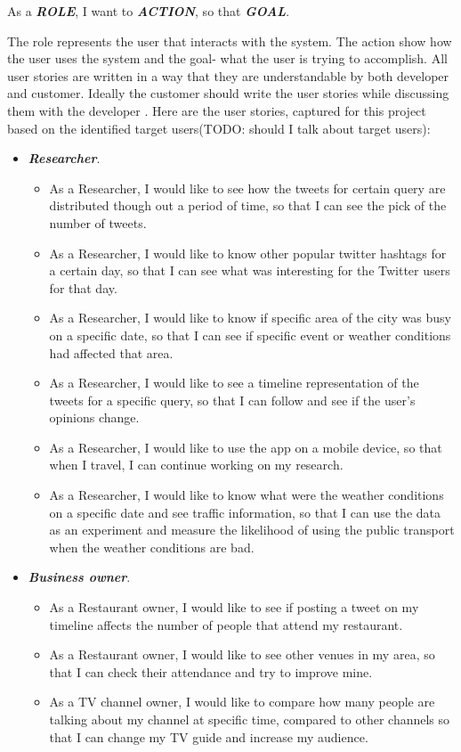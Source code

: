 \documentclass{l4proj}
\begin{document}
	\begin{center}
		As a \textbf{\textit{ROLE}}, I want to \textbf{\textit{ACTION}}, so that \textbf{\textit{GOAL}}. \cite{sets}
	\end{center}

The role represents the user that interacts with the system. The action show how the user uses the system and the goal- what the user is trying to accomplish. All user stories are written in a way that they are understandable by both developer and customer. Ideally the customer should write the user stories while discussing them with the developer \cite{sets}. Here are the user stories, captured for this project based on the identified target users(TODO: should I talk about target users):    

\begin{itemize}%
	\item \textbf{\textit{Researcher}}.
	\begin{itemize}
		\item As a Researcher, I would like to see how the tweets for certain query are distributed though out a period of time, so that I can see the pick of the number of tweets.
		\item As a Researcher, I would like to know other popular twitter hashtags for a certain day, so that I can see what was interesting for the Twitter users for that day.
		\item As a Researcher, I would like to know if specific area of the city was busy on a specific date, so that I can see if specific event or weather conditions had affected that area.
		\item As a Researcher, I would like to see a timeline representation of the tweets for a specific query, so that I can follow and see if the user’s opinions change.
		\item As a Researcher, I would like to use the app on a mobile device, so that when I travel, I can continue working on my research.
		\item As a Researcher, I would like to know what were the weather conditions on a specific date and see traffic information, so that I can use the data as an experiment and measure the likelihood of using the public transport when the weather conditions are bad. 
	\end{itemize}
	
	\item \textbf{\textit{Business owner}}.
	\begin{itemize}
		\item As a Restaurant owner, I would like to see if posting a tweet on my timeline affects the number of people that attend my restaurant.
		\item As a Restaurant owner, I would like to see other venues in my area, so that I can check their attendance and try to improve mine.
		\item As a TV channel owner, I would like to compare how many people are talking about my channel at specific time, compared to other channels so that I can change my TV guide and increase my audience.
	\end{itemize}
	

\end{itemize}
\end{document}
